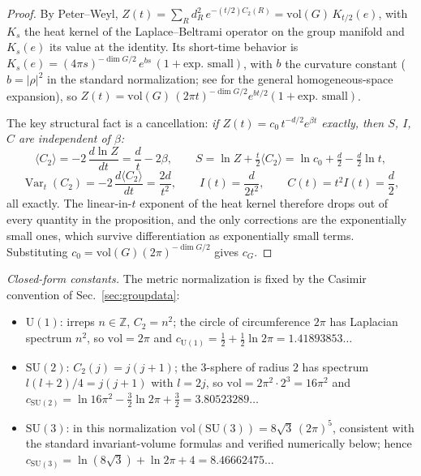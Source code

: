 \documentclass[11pt]{article}
\theoremstyle{remark}
\theoremstyle{plain}
\newcommand{\Var}{\operatorname{Var}}
\newcommand{\dG}{\dim G}
\begin{document}
\begin{proof}
By Peter--Weyl, $Z(t) = \sum_R d_R^2\, e^{-(t/2)C_2(R)} = \mathrm{vol}(G)\, K_{t/2}(e)$, with $K_s$ the heat kernel of the Laplace--Beltrami operator on the group manifold and $K_s(e)$ its value at the identity. Its short-time behavior is $K_s(e) = (4\pi s)^{-\dG/2}\, e^{b s}\,(1 + \text{exp.\ small})$, with $b$ the curvature constant ($b = |\rho|^2$ in the standard normalization; see \cite{Cam90} for the general homogeneous-space expansion), so $Z(t) = \mathrm{vol}(G)\,(2\pi t)^{-\dG/2} e^{bt/2}(1 + \text{exp.\ small})$.

The key structural fact is a cancellation: \emph{if $Z(t) = c_0\, t^{-d/2} e^{\beta t}$ exactly, then $S$, $I$, $C$ are independent of $\beta$:}
\[
\langle C_2\rangle = -2\,\frac{d\ln Z}{dt} = \frac{d}{t} - 2\beta, \qquad
S = \ln Z + \tfrac{t}{2}\langle C_2\rangle = \ln c_0 + \tfrac{d}{2} - \tfrac{d}{2}\ln t,
\]
\[
\Var_t(C_2) = -2\,\frac{d\langle C_2\rangle}{dt} = \frac{2d}{t^2}, \qquad I(t) = \frac{d}{2t^2}, \qquad C(t) = t^2 I(t) = \frac{d}{2},
\]
all exactly. The linear-in-$t$ exponent of the heat kernel therefore drops out of every quantity in the proposition, and the only corrections are the exponentially small ones, which survive differentiation as exponentially small terms. Substituting $c_0 = \mathrm{vol}(G)(2\pi)^{-\dG/2}$ gives $c_G$.
\end{proof}

\emph{Closed-form constants.} The metric normalization is fixed by the Casimir convention of Sec.~\ref{sec:groupdata}:
\begin{itemize}
\item $\mathrm{U}(1)$: irreps $n \in \mathbb{Z}$, $C_2 = n^2$; the circle of circumference $2\pi$ has Laplacian spectrum $n^2$, so $\mathrm{vol} = 2\pi$ and $c_{\mathrm{U}(1)} = \tfrac12 + \tfrac12\ln 2\pi = 1.41893853\ldots$
\item $\mathrm{SU}(2)$: $C_2(j) = j(j+1)$; the 3-sphere of radius $2$ has spectrum $l(l+2)/4 = j(j+1)$ with $l = 2j$, so $\mathrm{vol} = 2\pi^2 \cdot 2^3 = 16\pi^2$ and $c_{\mathrm{SU}(2)} = \ln 16\pi^2 - \tfrac32\ln 2\pi + \tfrac32 = 3.80523289\ldots$
\item $\mathrm{SU}(3)$: in this normalization $\mathrm{vol}(\mathrm{SU}(3)) = 8\sqrt{3}\,(2\pi)^5$, consistent with the standard invariant-volume formulas and verified numerically below; hence $c_{\mathrm{SU}(3)} = \ln(8\sqrt 3) + \ln 2\pi + 4 = 8.46662475\ldots$
\end{itemize}
\end{document}
